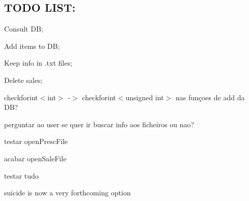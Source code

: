 \subsection*{T\+O\+DO L\+I\+ST\+:}


\begin{DoxyItemize}
\item Consult DB;
\item Add items to DB;
\item Keep info in .txt files;
\item Delete sales;
\item checkforint$<$int$>$ -\/$>$ checkforint$<$unsigned int$>$ nas funçoes de add da DB?
\item perguntar ao user se quer ir buscar info aos ficheiros ou nao?
\item testar open\+Presc\+File
\item acabar open\+Sale\+File
\item testar tudo
\item suicide is now a very forthcoming option 
\end{DoxyItemize}